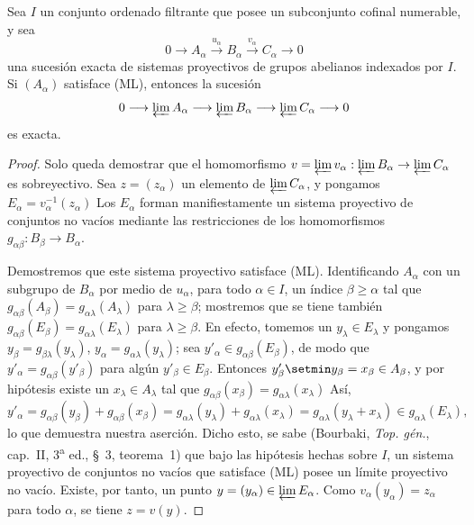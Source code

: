 \begin{proposition}[13.2.2]
\label{0.13.2.2}
\label{0.13.2.2-fr}
Sea $I$ un conjunto ordenado filtrante que posee un subconjunto
cofinal \textup{numerable}, y sea
\[
0\longrightarrow A_\alpha\xrightarrow{u_\alpha}B_\alpha
\xrightarrow{v_\alpha}C_\alpha\longrightarrow0
\]
una sucesión exacta de sistemas proyectivos de grupos abelianos indexados
por $I$.
Si $(A_\alpha)$ satisface {\rm(ML)}, entonces la sucesión
\[
0\longrightarrow\varprojlim A_\alpha
\longrightarrow\varprojlim B_\alpha
\longrightarrow\varprojlim C_\alpha\longrightarrow0
\]
es exacta.
\end{proposition}

\begin{proof}
Solo queda demostrar que el homomorfismo
$v=\varprojlim v_\alpha:\varprojlim B_\alpha\to\varprojlim C_\alpha$ es sobreyectivo. Sea $z=(z_\alpha)$ un elemento de $\varprojlim C_\alpha$, y pongamos
$E_\alpha=v_\alpha^{-1}(z_\alpha)$
Los $E_\alpha$ forman manifiestamente un sistema proyectivo de conjuntos no
vacíos mediante las restricciones de los homomorfismos
$g_{\alpha\beta}:B_\beta\to B_\alpha$.

Demostremos que este sistema proyectivo satisface (ML).
Identificando $A_\alpha$ con un subgrupo de $B_\alpha$ por medio de
$u_\alpha$, para todo $\alpha\in I$, un índice
$\beta\geq\alpha$ tal que $g_{\alpha\beta}(A_\beta)=g_{\alpha\lambda}(A_\lambda)$ para $\lambda\geq\beta$; mostremos que se tiene también $g_{\alpha\beta}(E_\beta)=g_{\alpha\lambda}(E_\lambda)$ para $\lambda\geq\beta$. En efecto, tomemos un $y_\lambda\in E_\lambda$ y pongamos $y_\beta=g_{\beta\lambda}(y_\lambda)$, $y_\alpha=g_{\alpha\lambda}(y_\lambda)$; sea $y'_\alpha\in g_{\alpha\beta}(E_\beta)$, de modo que
$y'_\alpha=g_{\alpha\beta}(y'_\beta)$ para algún
$y'_\beta\in E_\beta$.
Entonces $y'_\beta\setmin y_\beta=x_\beta\in A_\beta$, y por hipótesis existe
un $x_\lambda\in A_\lambda$ tal que
$g_{\alpha\beta}(x_\beta)=g_{\alpha\lambda}(x_\lambda)$
Así,
\[
y'_\alpha=g_{\alpha\beta}(y_\beta)+g_{\alpha\beta}(x_\beta)
=g_{\alpha\lambda}(y_\lambda)+g_{\alpha\lambda}(x_\lambda)
=g_{\alpha\lambda}(y_\lambda+x_\lambda)
\in g_{\alpha\lambda}(E_\lambda),
\] lo que demuestra nuestra aserción. Dicho esto, se sabe (Bourbaki, \emph{Top. gén.}, cap.~II, 3\textsuperscript{a} ed., §~3, teorema~1) que bajo las hipótesis hechas sobre $I$, un sistema proyectivo de conjuntos no vacíos que satisface (ML)
posee un límite proyectivo no vacío.
Existe, por tanto, un punto
$y=(y_\alpha)\in\varprojlim E_\alpha$.
Como $v_\alpha(y_\alpha)=z_\alpha$ para todo $\alpha$, se tiene
$z=v(y)$.
\end{proof}

